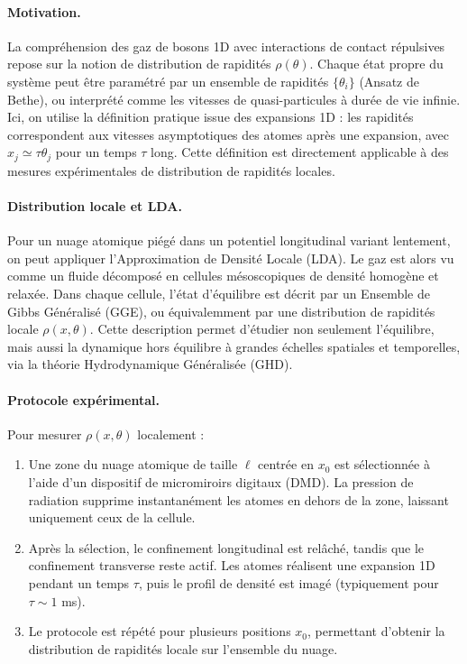 \paragraph{Motivation.}  
La compréhension des gaz de bosons 1D avec interactions de contact répulsives repose sur la notion de distribution de rapidités \(\rho(\theta)\). Chaque état propre du système peut être paramétré par un ensemble de rapidités \(\{\theta_i\}\) (Ansatz de Bethe), ou interprété comme les vitesses de quasi-particules à durée de vie infinie. Ici, on utilise la définition pratique issue des expansions 1D : les rapidités correspondent aux vitesses asymptotiques des atomes après une expansion, avec \(x_j \simeq \tau \theta_j\) pour un temps \(\tau\) long. Cette définition est directement applicable à des mesures expérimentales de distribution de rapidités locales.

\paragraph{Distribution locale et LDA.}  
Pour un nuage atomique piégé dans un potentiel longitudinal variant lentement, on peut appliquer l’Approximation de Densité Locale (LDA). Le gaz est alors vu comme un fluide décomposé en cellules mésoscopiques de densité homogène et relaxée. Dans chaque cellule, l’état d’équilibre est décrit par un Ensemble de Gibbs Généralisé (GGE), ou équivalemment par une distribution de rapidités locale \(\rho(x,\theta)\). Cette description permet d’étudier non seulement l’équilibre, mais aussi la dynamique hors équilibre à grandes échelles spatiales et temporelles, via la théorie Hydrodynamique Généralisée (GHD).

\paragraph{Protocole expérimental.}  
Pour mesurer \(\rho(x,\theta)\) localement :  
\begin{enumerate}
    \item Une zone du nuage atomique de taille \(\ell\) centrée en \(x_0\) est sélectionnée à l’aide d’un dispositif de micromiroirs digitaux (DMD). La pression de radiation supprime instantanément les atomes en dehors de la zone, laissant uniquement ceux de la cellule.
    \item Après la sélection, le confinement longitudinal est relâché, tandis que le confinement transverse reste actif. Les atomes réalisent une expansion 1D pendant un temps \(\tau\), puis le profil de densité est imagé (typiquement pour \(\tau\sim 1\) ms).
    \item Le protocole est répété pour plusieurs positions \(x_0\), permettant d’obtenir la distribution de rapidités locale sur l’ensemble du nuage.
\end{enumerate}

